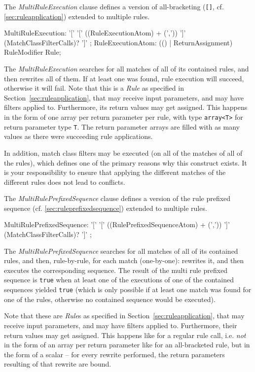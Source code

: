 The \emph{MultiRuleExecution} clause defines a version of all-bracketing (\texttt{[]}, cf. \ref{sec:ruleapplication}) extended to multiple rules.

\begin{rail}
  MultiRuleExecution: '[' '[' ((RuleExecutionAtom) + (',')) ']' (MatchClassFilterCalls)? ']' ;
  RuleExecutionAtom: (() | ReturnAssignment) RuleModifier Rule;
\end{rail}

The \emph{MultiRuleExecution} searches for all matches of all of its contained rules, and then rewrites all of them.
If at least one was found, rule execution will succeed, otherwise it will fail. 
Note that this is a \emph{Rule} as specified in Section~\ref{sec:ruleapplication}, that may receive input parameters, and may have filters applied to.
Furthermore, its return values may get assigned.
This happens in the form of one array per return parameter per rule, with type \verb#array<T># for return parameter type \verb#T#.
The return parameter arrays are filled with as many values as there were succeeding rule applications.

In addition, match class filters may be executed (on all of the matches of all of the rules), which defines one of the primary reasons why this construct exists.
It is your responsibility to ensure that applying the different matches of the different rules does not lead to conflicts.

The \emph{MultiRulePrefixedSequence} clause defines a version of the rule prefixed sequence (cf. \ref{sec:ruleprefixedsequence}) extended to multiple rules.

\begin{rail}
  MultiRulePrefixedSequence: '[' '[' ((RulePrefixedSequenceAtom) + (',')) ']' (MatchClassFilterCalls)? ']' ;
\end{rail}

The \emph{MultiRulePrefixedSequence} searches for all matches of all of its contained rules, and then, rule-by-rule, for each match (one-by-one): rewrites it, and then executes the corresponding sequence.
The result of the multi rule prefixed sequence is \texttt{true} when at least one of the executions of one of the contained sequences yielded \texttt{true} (which is only possible if at least one match was found for one of the rules, otherwise no contained sequence would be executed).

Note that these are \emph{Rule}s as specified in Section~\ref{sec:ruleapplication}, that may receive input parameters, and may have filters applied to.
Furthermore, their return values may get assigned.
This happens like for a regular rule call, i.e. \emph{not} in the form of an array per return parameter like for an all-bracketed rule, but in the form of a scalar -- for every rewrite performed, the return parameters resulting of that rewrite are bound.

